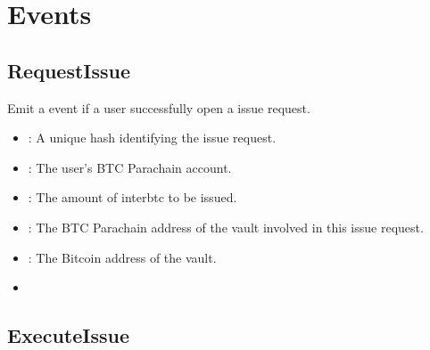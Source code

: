 \documentclass[a4paper,10pt,english]{sphinxmanual}
\begin{document}
\section{Events}
\label{\detokenize{spec/issue:events}}

\subsection{RequestIssue}
\label{\detokenize{spec/issue:id12}}
Emit a  event if a user successfully open a issue request.



\begin{itemize}
\item {} 
: A unique hash identifying the issue request.

\item {} 
: The user’s BTC Parachain account.

\item {} 
: The amount of interbtc to be issued.

\item {} 
: The BTC Parachain address of the vault involved in this issue request.

\item {} 
: The Bitcoin address of the vault.

\end{itemize}

\begin{itemize}
\item {} 
{\hyperref[\detokenize{spec/issue:requestissue}]{}}

\end{itemize}


\subsection{ExecuteIssue}
\label{\detokenize{spec/issue:id13}}

\end{document}
